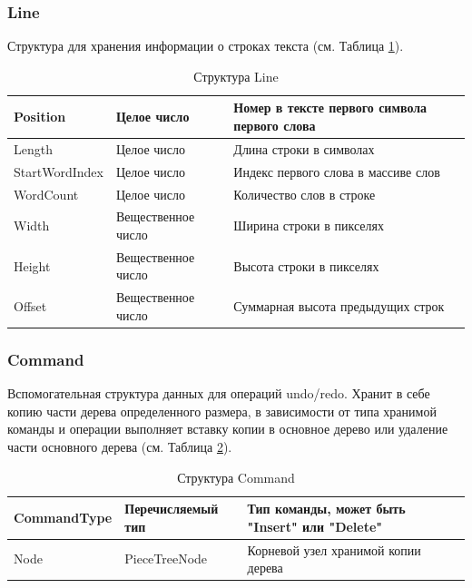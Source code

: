 \documentclass{fefu}
\begin{document}
			\subsubsection{Line}
				\par Структура для хранения информации о строках текста (см. Таблица 
				\ref{table:Line}).
				\begin{table}[H]
					\centering
					\begin{tabular}{|l|l|p{9cm}|}
						\hline
						Position & Целое число & Номер в тексте первого символа первого слова 
						\\
						\hline
						Length  & Целое число & Длина строки в символах \\
						\hline
						StartWordIndex & Целое число & Индекс первого слова в массиве слов \\
						\hline
						WordCount & Целое число & Количество слов в строке \\
						\hline
						Width & Вещественное число & Ширина строки в пикселях \\
						\hline
						Height & Вещественное число & Высота строки в пикселях \\
						\hline
						Offset & Вещественное число & Суммарная высота предыдущих строк \\
						\hline
					\end{tabular}
					\caption{Структура Line}
					\label{table:Line}
				\end{table}
			\subsubsection{Command}
				\par Вспомогательная структура данных для операций undo/redo. Хранит в себе
				копию части дерева определенного размера, в зависимости от типа хранимой
				команды и операции выполняет вставку копии в основное дерево или удаление
				части основного дерева (см. Таблица \ref{table:Command}).
				\begin{table}[h]
					\centering
					\begin{tabular}{|l|l|p{9cm}|}
						\hline
						CommandType & Перечисляемый тип & Тип команды, может быть "Insert" или 
						"Delete" \\
						\hline
						Node & PieceTreeNode & Корневой узел хранимой копии дерева \\
						\hline
					\end{tabular}
					\caption{Структура Command}
					\label{table:Command}
				\end{table}
\end{document}
